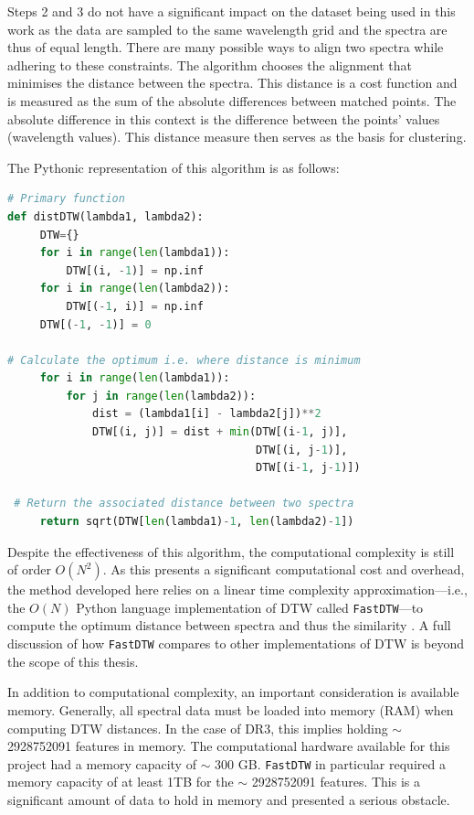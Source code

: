 Steps 2 and 3 do not have a significant impact on the dataset being used in this work as the data are sampled to the same wavelength grid and the spectra are thus of equal length. 
There are many possible ways to align two spectra while adhering to these constraints. The algorithm chooses the alignment that minimises the distance between the spectra. This distance is a cost function and is measured as the sum of the absolute differences between matched points. The absolute difference in this context is the difference between the points' values (wavelength values). This distance measure then serves as the basis for clustering.


The Pythonic representation of this algorithm is as follows:

\begin{lstlisting}[language=Python]
# Primary function
def distDTW(lambda1, lambda2):
     DTW={}
     for i in range(len(lambda1)):
         DTW[(i, -1)] = np.inf
     for i in range(len(lambda2)):
         DTW[(-1, i)] = np.inf
     DTW[(-1, -1)] = 0
 
# Calculate the optimum i.e. where distance is minimum
     for i in range(len(lambda1)):
         for j in range(len(lambda2)):
             dist = (lambda1[i] - lambda2[j])**2
             DTW[(i, j)] = dist + min(DTW[(i-1, j)],
                                      DTW[(i, j-1)], 
                                      DTW[(i-1, j-1)])
 
 # Return the associated distance between two spectra
     return sqrt(DTW[len(lambda1)-1, len(lambda2)-1])
\end{lstlisting}

Despite the effectiveness of this algorithm, the computational complexity is still of order $O(N^2)$. As this presents a significant computational cost and overhead, the method developed here relies on a linear time complexity approximation—i.e., the $O(N)$ Python language implementation of DTW called \texttt{FastDTW}—to compute the optimum distance between spectra and thus the similarity \citep{salvador2007toward}. %
A full discussion of how \texttt{FastDTW} compares to other implementations of DTW is beyond the scope of this thesis.

In addition to computational complexity, an important consideration is available memory. Generally, all spectral data must be loaded into memory (RAM) when computing DTW distances. In the case of DR3, this implies holding $\sim$ \num[round-precision=2,round-mode=figures, scientific-notation=true]{2928752091} features in memory. The computational hardware available for this project had a memory capacity of $\sim$ 300 GB. \texttt{FastDTW} in particular required a memory capacity of at least 1TB for the $\sim$ \num[round-precision=2,round-mode=figures, scientific-notation=true]{2928752091} features. This is a significant amount of data to hold in memory and presented a serious obstacle.

